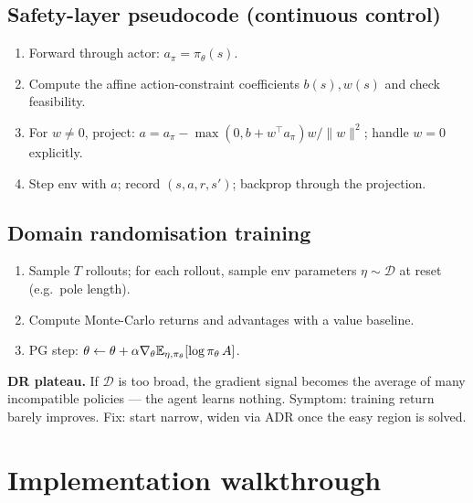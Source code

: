 \documentclass[11pt,oneside]{scrbook}
\begin{document}
\section{Safety-layer pseudocode (continuous control)}

\begin{tcolorbox}[colback=mintedbg, colframe=rlgray!50, title=\textbf{Algorithm: Safety layer wrapper}]
\begin{enumerate}[leftmargin=*]
  \item Forward through actor: $a_\pi = \pi_\theta(s)$.
  \item Compute the affine action-constraint coefficients $b(s),w(s)$ and check feasibility.
  \item For $w\ne0$, project: $a=a_\pi-\max(0,b+w^\top a_\pi)w/\|w\|^2$; handle $w=0$ explicitly.
  \item Step env with $a$; record $(s, a, r, s')$; backprop through the
        projection.
\end{enumerate}
\end{tcolorbox}

\section{Domain randomisation training}

\begin{tcolorbox}[colback=mintedbg, colframe=rlgray!50, title=\textbf{Algorithm: DR-PG (one epoch)}]
\begin{enumerate}[leftmargin=*]
  \item Sample $T$ rollouts; for each rollout, sample env parameters
        $\eta \sim \mathcal{D}$ at reset (e.g.\ pole length).
  \item Compute Monte-Carlo returns and advantages with a value baseline.
  \item PG step: $\theta \leftarrow \theta + \alpha \nabla_\theta \mathbb{E}_{\eta, \pi_\theta}[\log \pi_\theta\, A]$.
\end{enumerate}
\end{tcolorbox}

\begin{pitfall}
\textbf{DR plateau.} If $\mathcal{D}$ is too broad, the gradient signal becomes
the average of many incompatible policies --- the agent learns nothing.
Symptom: training return barely improves. Fix: start narrow, widen via ADR
once the easy region is solved.
\end{pitfall}

\chapter{Implementation walkthrough}
\end{document}
